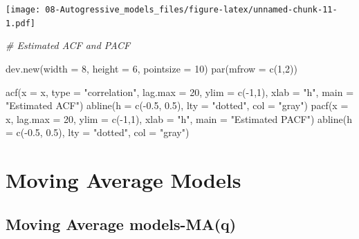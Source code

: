 \documentclass[
]{book}
\newenvironment{Shaded}{\begin{snugshade}}{\end{snugshade}}
\newcommand{\AttributeTok}[1]{\textcolor[rgb]{0.77,0.63,0.00}{#1}}
\newcommand{\CommentTok}[1]{\textcolor[rgb]{0.56,0.35,0.01}{\textit{#1}}}
\newcommand{\DecValTok}[1]{\textcolor[rgb]{0.00,0.00,0.81}{#1}}
\newcommand{\FloatTok}[1]{\textcolor[rgb]{0.00,0.00,0.81}{#1}}
\newcommand{\FunctionTok}[1]{\textcolor[rgb]{0.00,0.00,0.00}{#1}}
\newcommand{\NormalTok}[1]{#1}
\newcommand{\SpecialCharTok}[1]{\textcolor[rgb]{0.00,0.00,0.00}{#1}}
\newcommand{\StringTok}[1]{\textcolor[rgb]{0.31,0.60,0.02}{#1}}
\theoremstyle{definition}
\theoremstyle{definition}
\theoremstyle{definition}
\theoremstyle{definition}
\theoremstyle{remark}
\begin{document}
\texttt{[image: 08-Autogressive\_models\_files/figure-latex/unnamed-chunk-11-1.pdf]}

\begin{Shaded}
\begin{Highlighting}[]
\CommentTok{\# Estimated ACF and PACF}

  \FunctionTok{dev.new}\NormalTok{(}\AttributeTok{width =} \DecValTok{8}\NormalTok{, }\AttributeTok{height =} \DecValTok{6}\NormalTok{, }\AttributeTok{pointsize =} \DecValTok{10}\NormalTok{)}
  \FunctionTok{par}\NormalTok{(}\AttributeTok{mfrow =} \FunctionTok{c}\NormalTok{(}\DecValTok{1}\NormalTok{,}\DecValTok{2}\NormalTok{))}

  \FunctionTok{acf}\NormalTok{(}\AttributeTok{x =}\NormalTok{ x, }\AttributeTok{type =} \StringTok{"correlation"}\NormalTok{, }\AttributeTok{lag.max =} \DecValTok{20}\NormalTok{, }\AttributeTok{ylim =} \FunctionTok{c}\NormalTok{(}\SpecialCharTok{{-}}\DecValTok{1}\NormalTok{,}\DecValTok{1}\NormalTok{), }\AttributeTok{xlab =} \StringTok{"h"}\NormalTok{,}
    \AttributeTok{main =} \StringTok{"Estimated ACF"}\NormalTok{)}
  \FunctionTok{abline}\NormalTok{(}\AttributeTok{h =} \FunctionTok{c}\NormalTok{(}\SpecialCharTok{{-}}\FloatTok{0.5}\NormalTok{, }\FloatTok{0.5}\NormalTok{), }\AttributeTok{lty =} \StringTok{"dotted"}\NormalTok{, }\AttributeTok{col =} \StringTok{"gray"}\NormalTok{)}
  \FunctionTok{pacf}\NormalTok{(}\AttributeTok{x =}\NormalTok{ x, }\AttributeTok{lag.max =} \DecValTok{20}\NormalTok{, }\AttributeTok{ylim =} \FunctionTok{c}\NormalTok{(}\SpecialCharTok{{-}}\DecValTok{1}\NormalTok{,}\DecValTok{1}\NormalTok{), }\AttributeTok{xlab =} \StringTok{"h"}\NormalTok{,}
    \AttributeTok{main =} \StringTok{"Estimated PACF"}\NormalTok{)}
  \FunctionTok{abline}\NormalTok{(}\AttributeTok{h =} \FunctionTok{c}\NormalTok{(}\SpecialCharTok{{-}}\FloatTok{0.5}\NormalTok{, }\FloatTok{0.5}\NormalTok{), }\AttributeTok{lty =} \StringTok{"dotted"}\NormalTok{, }\AttributeTok{col =} \StringTok{"gray"}\NormalTok{)}
\end{Highlighting}
\end{Shaded}

\hypertarget{moving-average-models}{%
\chapter{Moving Average Models}\label{moving-average-models}}

\hypertarget{moving-average-models-maq}{%
\section{Moving Average models-MA(q)}\label{moving-average-models-maq}}
\end{document}
